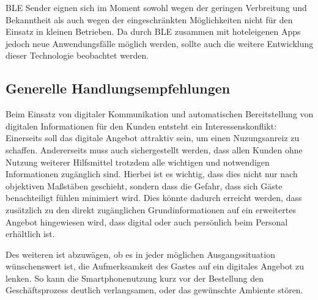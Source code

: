 BLE Sender eignen sich im Moment sowohl wegen der geringen Verbreitung und Bekanntheit als auch wegen der eingeschränkten Möglichkeiten nicht für den Einsatz in kleinen Betrieben. Da durch BLE zusammen mit hoteleigenen Apps jedoch neue Anwendungsfälle möglich werden, sollte auch die weitere Entwicklung dieser Technologie beobachtet werden.



\subsection{Generelle Handlungsempfehlungen} %
\label{sub:psychologische_handlungsempfehlungen}
Beim Einsatz von digitaler Kommunikation und automatischen Bereitstellung von digitalen Informationen für den Kunden entsteht ein Interessenskonflikt: Einerseits soll das digitale Angebot attraktiv sein, um einen Nuzungsanreiz zu schaffen. Andererseits muss auch sichergestellt werden, dass allen Kunden ohne Nutzung weiterer Hilfsmittel trotzdem alle wichtigen und notwendigen Informationen zugänglich sind.
Hierbei ist es wichtig, dass dies nicht nur nach objektiven Maßstäben geschieht, sondern dass die Gefahr, dass sich Gäste benachteiligt fühlen minimiert wird. Dies könnte dadurch erreicht werden, dass zusätzlich zu den direkt zugänglichen Grundinformationen auf ein erweitertes Angebot hingewiesen wird, dass digital oder auch persönlich beim Personal erhältlich ist.

Des weiteren ist abzuwägen, ob es in jeder möglichen Ausgangssituation wünschenswert ist, die Aufmerksamkeit des Gastes auf ein digitales Angebot zu lenken. So kann die Smartphonenutzung kurz vor der Bestellung den Geschäftsprozess deutlich verlangsamen, oder das gewünschte Ambiente stören. 


